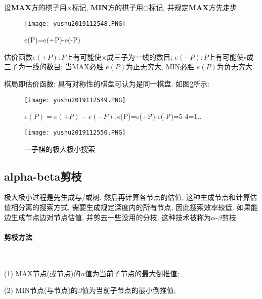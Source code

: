 设\textbf{MAX}方的棋子用$\times$标记, \textbf{MIN}方的棋子用$○$标记, 并规定\textbf{MAX}方先走步.
\begin{figure}[H]
    \centering
    \texttt{[image: yushu2019112548.PNG]}
    \caption{e(P)=e(+P)-e(-P)}
    \label{AI32fig48}
\end{figure}
\begin{result}
估价函数$e(+P): P$上有可能使$\times$成三子为一线的数目; $e(-P): P$上有可能使$\circ$成三子为一线的数目;
当\textup{MAX}必胜 $e(P)$为正无穷大, \textup{MIN}必胜 $e(P)$为负无穷大.

棋局即估价函数: 具有对称性的棋盘可认为是同一棋盘. 如图\ref{AI32fig49}所示:
\begin{figure}[H]
    \centering
    \texttt{[image: yushu2019112549.PNG]}
    \caption{$e(P)=e(+P)-e(-P), $e(P)=e(+P)-e(-P)=5-4=1$..$}
    \label{AI32fig49}
\end{figure}
\end{result}
\begin{figure}[H]
    \centering
    \texttt{[image: yushu2019112550.PNG]}
    \vspace{-0.5cm}
    \caption{一子棋的极大极小搜索}
    \label{AI32fig50}
\end{figure}
\subsection{alpha-beta剪枝}
极大极小过程是先生成与/或树, 然后再计算各节点的估值, 这种生成节点和计算估值相分离的搜索方式, 需要生成规定深度内的所有节点, 因此搜索效率较低.
如果能边生成节点边对节点估值, 并剪去一些没用的分枝, 这种技术被称为$\alpha$-$\beta$剪枝.
\paragraph{剪枝方法}~{}

(1) \textup{MAX}节点(或节点)的$\alpha$值为当前子节点的最大倒推值;

(2) \textup{MIN}节点(与节点)的$\beta$值为当前子节点的最小倒推值;

